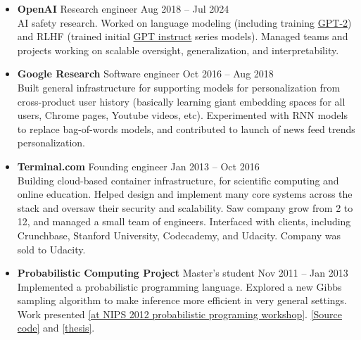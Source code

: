 \documentclass[11 pt]{article}
\begin{document}
\begin{itemize}

\item \textbf{OpenAI} Research engineer \hfill Aug 2018 -- Jul 2024 \\
  AI safety research.  Worked on language modeling (including training \href{https://openai.com/blog/better-language-models/}{GPT-2}) and RLHF (trained initial \href{https://openai.com/blog/instruction-following/}{GPT instruct} series models).  Managed teams and projects working on scalable oversight, generalization, and interpretability.


\item \textbf{Google Research} Software engineer \hfill Oct 2016 -- Aug 2018 \\
Built general infrastructure
for supporting models for personalization from cross-product user history (basically learning giant embedding spaces for all users, Chrome pages, Youtube videos, etc).
Experimented with RNN models to replace bag-of-words models, and contributed to launch of news feed trends personalization.

\item \textbf{Terminal.com} Founding engineer \hfill Jan 2013 -- Oct 2016 \\
Building cloud-based container infrastructure, for scientific computing and online education.
Helped design and implement many core systems across the stack %
and oversaw their security and scalability.
Saw company grow from 2 to 12, and managed a small team of engineers.
Interfaced with clients, including Crunchbase, Stanford University, Codecademy, and Udacity.
Company was sold to Udacity.

\item \textbf{Probabilistic Computing Project} Master's student \hfill Nov 2011 -- Jan 2013 \\
Implemented a probabilistic programming language.
Explored a new Gibbs sampling algorithm to make inference more efficient in very general settings.
Work presented \href{http://probabilistic-programming.org/wiki/NIPS*2012_Workshop/Schedule#poster-wu}{[at NIPS 2012 probabilistic programing workshop]}.
\href{https://github.com/WuTheFWasThat/PyChurch.}{[Source code]}
and
\href{https://github.com/WuTheFWasThat/PyChurch/blob/master/papers/MEng\%20thesis.pdf}{[thesis]}.



\end{itemize}
\end{document}
